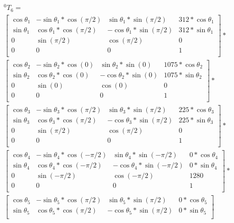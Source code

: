 \begin{multline}
^0T_6=\\
\begin{bmatrix}
\cos\theta_1 & -\sin\theta_1*\cos(\pi/2) & \sin\theta_1*\sin(\pi/2) & 312*\cos\theta_1 \\
\sin\theta_1 & \cos\theta_1*\cos(\pi/2) & -\cos\theta_1*\sin(\pi/2) & 312*\sin\theta_1 \\
0 & \sin(\pi/2) & \cos(\pi/2) & 0 \\
0 & 0 & 0 & 1 \\
\end{bmatrix}
*\\
\begin{bmatrix}
\cos\theta_2 & -\sin\theta_2*\cos(0) & \sin\theta_2*\sin(0) & 1075*\cos\theta_2 \\
\sin\theta_2 & \cos\theta_2*\cos(0) & -\cos\theta_2*\sin(0) & 1075*\sin\theta_2 \\
0 & \sin(0) & \cos(0) & 0 \\
0 & 0 & 0 & 1 \\
\end{bmatrix}
*\\
\begin{bmatrix}
\cos\theta_3 & -\sin\theta_3*\cos(\pi/2) & \sin\theta_3*\sin(\pi/2) & 225*\cos\theta_3 \\
\sin\theta_3 & \cos\theta_3*\cos(\pi/2) & -\cos\theta_3*\sin(\pi/2) & 225*\sin\theta_3 \\
0 & \sin(\pi/2) & \cos(\pi/2) & 0 \\
0 & 0 & 0 & 1 \\
\end{bmatrix}
*\\
\begin{bmatrix}
\cos\theta_4 & -\sin\theta_4*\cos(-\pi/2) & \sin\theta_4*\sin(-\pi/2) & 0*\cos\theta_4 \\
\sin\theta_4 & \cos\theta_4*\cos(-\pi/2) & -\cos\theta_4*\sin(-\pi/2) & 0*\sin\theta_4 \\
0 & \sin(-\pi/2) & \cos(-\pi/2) & 1280 \\
0 & 0 & 0 & 1 \\
\end{bmatrix}
*\\
\begin{bmatrix}
\cos\theta_5 & -\sin\theta_5*\cos(\pi/2) & \sin\theta_5*\sin(\pi/2) & 0*\cos\theta_5 \\
\sin\theta_5 & \cos\theta_5*\cos(\pi/2) & -\cos\theta_5*\sin(\pi/2) & 0*\sin\theta_5 \\

\end{bmatrix}
\end{multline}
